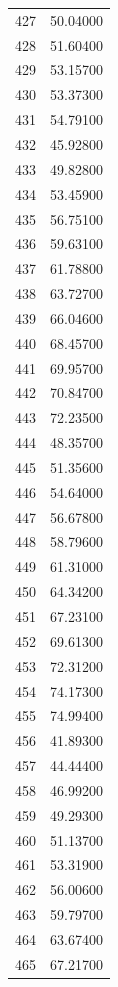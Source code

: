 \documentclass[
  letterpaper,
  DIV=11,
  numbers=noendperiod]{scrreprt}
\begin{document}
\begin{tcolorbox}
\begin{tabular}{lr}
427  &         50.04000 \\
428  &         51.60400 \\
429  &         53.15700 \\
430  &         53.37300 \\
431  &         54.79100 \\
432  &         45.92800 \\
433  &         49.82800 \\
434  &         53.45900 \\
435  &         56.75100 \\
436  &         59.63100 \\
437  &         61.78800 \\
438  &         63.72700 \\
439  &         66.04600 \\
440  &         68.45700 \\
441  &         69.95700 \\
442  &         70.84700 \\
443  &         72.23500 \\
444  &         48.35700 \\
445  &         51.35600 \\
446  &         54.64000 \\
447  &         56.67800 \\
448  &         58.79600 \\
449  &         61.31000 \\
450  &         64.34200 \\
451  &         67.23100 \\
452  &         69.61300 \\
453  &         72.31200 \\
454  &         74.17300 \\
455  &         74.99400 \\
456  &         41.89300 \\
457  &         44.44400 \\
458  &         46.99200 \\
459  &         49.29300 \\
460  &         51.13700 \\
461  &         53.31900 \\
462  &         56.00600 \\
463  &         59.79700 \\
464  &         63.67400 \\
465  &         67.21700 \\

\end{tabular}
\end{tcolorbox}
\end{document}

